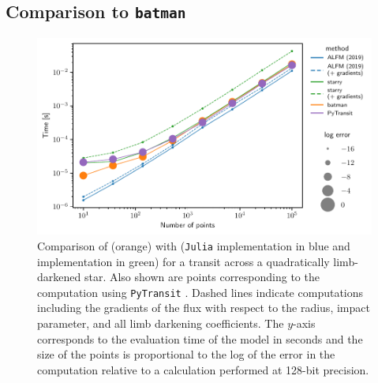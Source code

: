 \documentclass[modern,trackchanges]{aastex63}
\begin{document}
\subsection{Comparison to \texttt{batman}}

\begin{figure}[p!]
    \begin{centering}
    \includegraphics[width=0.95\linewidth]{figures/python/compare_to_batman.pdf}
    \caption{Comparison of \citet{Kreidberg2015} (orange) with \thiswork
             (\texttt{Julia} implementation in blue and \starry implementation
             in green) for a transit across a quadratically limb-darkened star.
             Also shown are points corresponding to the computation using
             \texttt{PyTransit} \citep{Parviainen2015b}. Dashed lines indicate
             computations including the gradients of the flux with respect to
             the radius, impact parameter, and all limb darkening coefficients.
             The $y$-axis corresponds to the evaluation time of the model in
             seconds and the size of the points is proportional to the log of
             the error in the computation relative to a calculation performed
             at 128-bit precision.
    \label{fig:batman_comparison}}
    \end{centering}
\end{figure}
\end{document}
